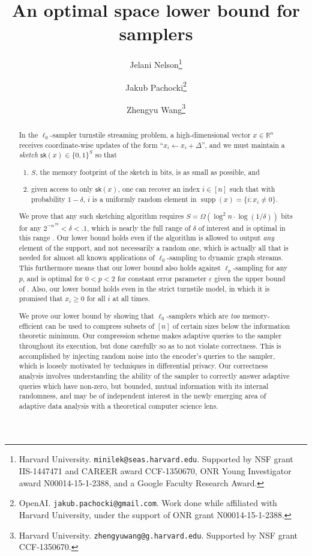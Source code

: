 \documentclass[10pt]{article}
\title{An optimal space lower bound for samplers}
\author{Jelani Nelson\thanks{Harvard University. \texttt{minilek@seas.harvard.edu}. Supported by NSF grant IIS-1447471 and
   CAREER award CCF-1350670, ONR Young Investigator award N00014-15-1-2388, and a Google Faculty Research Award.}
  \and Jakub Pachocki\thanks{OpenAI. \texttt{jakub.pachocki@gmail.com}. Work done while affiliated with Harvard University, under the support of ONR grant N00014-15-1-2388.}
  \and Zhengyu Wang\thanks{Harvard University. \texttt{zhengyuwang@g.harvard.edu}. Supported by NSF grant CCF-1350670.}}
\newcommand{\supp}{\mathop{supp}}
\newcommand{\R}{\mathbb{R}}
\newcommand{\sk}{\mathsf{sk}}
\newcommand{\eps}{\varepsilon}
\begin{document}
\maketitle

\begin{abstract}
In the $\ell_0$-sampler turnstile streaming problem, a high-dimensional vector $x\in\R^n$ receives coordinate-wise updates of the form ``$x_i\leftarrow x_i + \Delta$'', and we must  maintain a {\em sketch} $\sk(x)\in\{0,1\}^S$ so that
\begin{enumerate}
\item $S$, the memory footprint of the sketch in bits, is as small as possible, and
\item given access to only $\sk(x)$, one can recover an index $i\in[n]$ such that with probability $1-\delta$, $i$ is a uniformly random element in $\supp(x) = \{i : x_i\neq 0\}$.
\end{enumerate}
We prove that any such sketching algorithm requires $S = \Omega(\log^2 n\cdot \log(1/\delta))$ bits for any $2^{-n^{.99}} < \delta < .1$, which is nearly the full range of $\delta$ of interest and is optimal in this range \cite{JowhariST11}. Our lower bound holds even if the algorithm is allowed to output {\em any} element of the support, and not necessarily a random one, which is actually all that is needed for almost all known applications of $\ell_0$-sampling to dynamic graph streams. This furthermore means that our lower bound also holds against $\ell_p$-sampling for any $p$, and is optimal for $0<p<2$ for constant error parameter $\eps$ given the upper bound of \cite{JowhariST11}. Also, our lower bound holds even in the strict turnstile model, in which it is promised that $x_i\ge 0$ for all $i$ at all times.

We prove our lower bound by showing that $\ell_0$-samplers which are {\em too} memory-efficient can be used to compress subsets of $[n]$ of certain sizes below the information theoretic minimum. Our compression scheme makes adaptive queries to the sampler throughout its execution, but done carefully so as to not violate correctness. This is accomplished by injecting random noise into the encoder's queries to the sampler, which is loosely motivated by techniques in differential privacy. Our correctness analysis involves understanding the ability of the sampler to correctly answer adaptive queries which have non-zero, but bounded, mutual information with its internal randomness, and may be of independent interest in the newly emerging area of adaptive data analysis with a theoretical computer science lens.
\end{abstract}









\end{document}
